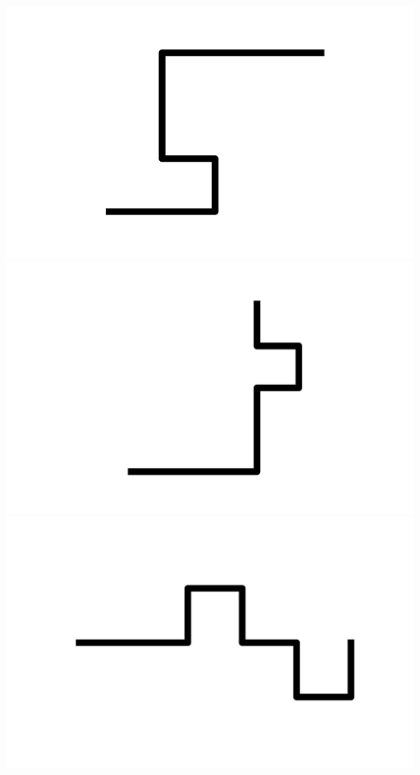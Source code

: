 \documentclass[]{report}
\begin{document}
\includegraphics[scale=.1]{pictures/21/state_cluster_shapes_40.pdf} 
\includegraphics[scale=.1]{pictures/21/state_cluster_shapes_41.pdf} 
\includegraphics[scale=.1]{pictures/21/state_cluster_shapes_42.pdf} 
\end{document}
